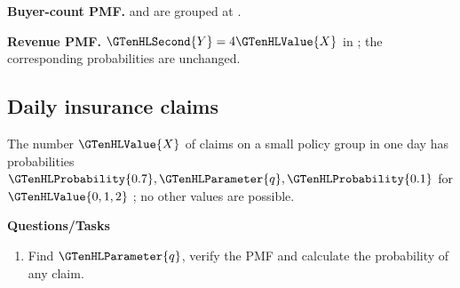 \Needspace{6.8cm}
\par\noindent \begin{minipage}[t]{.485\linewidth}
\centering
{}
\par\small \textbf{Buyer-count PMF.}  and  are grouped at .
\end{minipage}\hfill\begin{minipage}[t]{.485\linewidth}
\centering
{}
\par\small \textbf{Revenue PMF.} $\GTenHLSecond{Y}=4\GTenHLValue{X}$ in ; the corresponding probabilities are unchanged.
\end{minipage}\par\medskip

\subsection{Daily insurance claims}
\label{subsec:t2-c1-daily-insurance-claims}
The number $\GTenHLValue{X}$ of claims on a small policy group in one day has probabilities $\GTenHLProbability{0.7},\GTenHLParameter{q},\GTenHLProbability{0.1}$ for $\GTenHLValue{0,1,2}$ ; no other values are possible.

\textbf{Questions/Tasks}
\begin{enumerate}
\item Find $\GTenHLParameter{q}$, verify the PMF and calculate the probability of any claim.
\end{enumerate}
